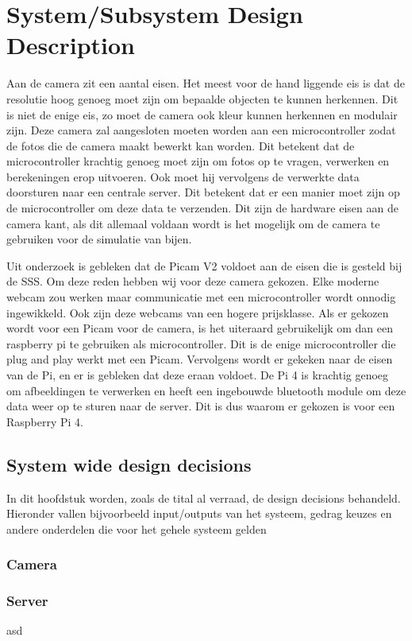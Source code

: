 \section{System/Subsystem Design Description}
Aan de camera zit een aantal eisen. Het meest voor de hand liggende eis is dat de resolutie hoog genoeg moet zijn
om bepaalde objecten te kunnen herkennen. Dit is niet de enige eis, zo moet de camera ook kleur kunnen herkennen 
en modulair zijn. Deze camera zal aangesloten moeten worden aan een microcontroller 
zodat de fotos die de camera maakt bewerkt kan worden. Dit betekent dat de microcontroller krachtig genoeg moet zijn 
om fotos op te vragen, verwerken en berekeningen erop uitvoeren. Ook moet hij vervolgens de verwerkte data doorsturen 
naar een centrale server. Dit betekent dat er een manier moet zijn op de microcontroller om deze data te verzenden.
Dit zijn de hardware eisen aan de camera kant, als dit allemaal voldaan wordt is het mogelijk om de camera te 
gebruiken voor de simulatie van bijen.


Uit onderzoek is gebleken dat de Picam V2 voldoet aan de eisen die is gesteld bij de SSS. 
Om deze reden hebben wij voor deze camera gekozen. Elke moderne webcam zou werken maar communicatie met een 
microcontroller wordt onnodig ingewikkeld. Ook zijn deze webcams van een hogere prijsklasse.
Als er gekozen wordt voor een Picam voor de camera, is het uiteraard gebruikelijk om dan een raspberry pi 
te gebruiken als microcontroller. Dit is de enige microcontroller die plug and play werkt met een Picam. 
Vervolgens wordt er gekeken naar de eisen van de Pi, en er is gebleken dat deze eraan voldoet. 
De Pi 4 is krachtig genoeg om afbeeldingen te verwerken en heeft een ingebouwde bluetooth module 
om deze data weer op te sturen naar de server. Dit is dus waarom er gekozen is voor een Raspberry Pi 4.

\subsection{System wide design decisions}
In dit hoofdstuk worden, zoals de tital al verraad, de design decisions behandeld. Hieronder vallen bijvoorbeeld 
input/outputs van het systeem, gedrag keuzes en andere onderdelen die voor het gehele systeem gelden


\subsubsection*{Camera}

\subsubsection*{Server}
asd
\newline

